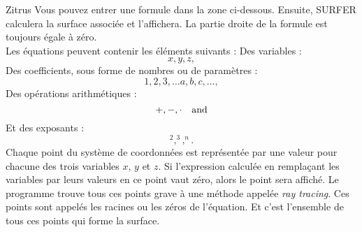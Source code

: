 \begin{surferPage}{Zitrus}
Vous pouvez entrer une formule dans la zone ci-dessous. Ensuite, SURFER calculera la surface associée et l'affichera. La partie droite de la formule est toujours égale à zéro.
\\
Les équations peuvent contenir les éléments suivants :
\newline
Des variables : 
\[x, y, z, \]
Des coefficients, sous forme de nombres ou de paramètres : 
\[1, 2, 3, \dots a, b, c, \dots, \]
Des opérations arithmétiques :
\[+,  - , \cdot \quad \textnormal{and} \]
Et des exposants :
\[ ^2, ^3, ^n .\]
Chaque point du système de coordonnées est représentée par une valeur pour chacune des trois variables $x$, $y$ et $z$. Si l'expression calculée en remplaçant les variables par leurs valeurs en ce point vaut zéro, alors le point sera affiché. Le programme trouve tous ces points grave à une méthode appelée \textit{ray tracing}. Ces points sont appelés les racines ou les zéros de l'équation. Et c'est l'ensemble de tous ces points qui forme la surface.
\end{surferPage}
